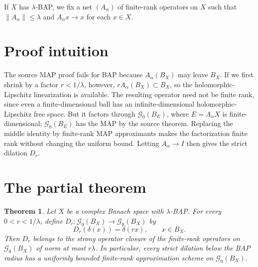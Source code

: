 \documentclass[11pt]{article}
\newtheorem{theorem}{Theorem}
\newcommand{\G}{\mathcal G}
\begin{document}
If \(X\) has \(\lambda\)-BAP, we fix a net \((A_\alpha)\) of finite-rank
operators on \(X\) such that \(\|A_\alpha\|\leq \lambda\) and
\(A_\alpha x\to x\) for each \(x\in X\).

\section*{Proof intuition}

The source MAP proof fails for BAP because \(A_\alpha(B_X)\) may leave
\(B_X\).  If we first shrink by a factor \(r<1/\lambda\), however,
\(rA_\alpha(B_X)\subset B_X\), so the holomorphic-Lipschitz linearization is
available.  The resulting operator need not be finite rank, since even a
finite-dimensional ball has an infinite-dimensional holomorphic-Lipschitz
free space.  But it factors through \(\G_0(B_E)\), where \(E=A_\alpha X\) is
finite-dimensional; \(\G_0(B_E)\) has the MAP by the source theorem.  Replacing
the middle identity by finite-rank MAP approximants makes the factorization
finite rank without changing the uniform bound.  Letting \(A_\alpha\to I\)
then gives the strict dilation \(D_r\).

\section*{The partial theorem}

\begin{theorem}
Let \(X\) be a complex Banach space with \(\lambda\)-BAP.  For every
\(0<r<1/\lambda\), define \(D_r:\G_0(B_X)\to\G_0(B_X)\) by
\[
  D_r(\delta(x))=\delta(rx),\qquad x\in B_X.
\]
Then \(D_r\) belongs to the strong operator closure of the finite-rank
operators on \(\G_0(B_X)\) of norm at most \(r\lambda\).  In particular, every
strict dilation below the BAP radius has a uniformly bounded finite-rank
approximation scheme on \(\G_0(B_X)\).
\end{theorem}
\end{document}
